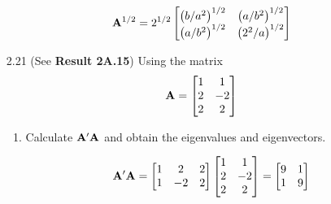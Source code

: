 \begin{enumerate}[font=\bfseries]
        \[
            \bold{A}^{1/2}
            =
            2^{1/2}
            \begin{bmatrix}
                {\left(b/a^2\right)}^{1/2} & {\left(a/b^2\right)}^{1/2} \\
                {\left(a/b^2\right)}^{1/2} & {\left(2^2/a\right)}^{1/2}
            \end{bmatrix}
        \]
        \item[2.21] (See \textbf{Result 2A.15}) Using the matrix
        \[
            \bold{A} = 
            \begin{bmatrix}
                1 & 1 \\
                2 & -2 \\
                2 & 2
            \end{bmatrix}
        \]
        \begin{enumerate}
            \item Calculate $\bold{A}^\prime\bold{A}$ and obtain the eigenvalues and eigenvectors.
            \par
            \[
                \bold{A}^\prime\bold{A}
                =
                \begin{bmatrix}
                    1 & 2 & 2 \\
                    1 & -2 & 2
                \end{bmatrix}
                \begin{bmatrix}
                    1 & 1 \\
                    2 & -2 \\
                    2 & 2
                \end{bmatrix}
                =
                \begin{bmatrix}
                    9 & 1 \\
                    1 & 9
                \end{bmatrix}
            \]
            

\end{enumerate}
\end{enumerate}
